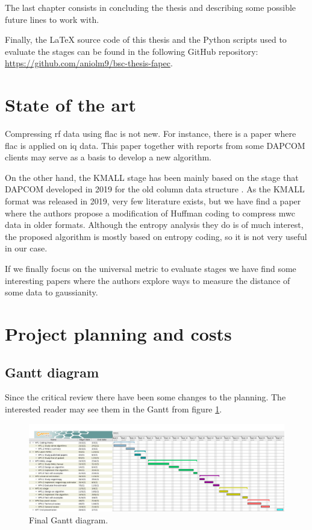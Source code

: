 The last chapter consists in concluding the thesis and describing some possible future lines to work with.

Finally, the \LaTeX{} source code of this thesis and the Python scripts used to evaluate the stages can be found in the following GitHub repository: \url{https://github.com/aniolm9/bsc-thesis-fapec}.

\section{State of the art}
Compressing \acrshort{rf} data using \acrshort{flac} is not new. For instance, there is a paper \parencite{IQFlac} where \acrshort{flac} is applied on \acrshort{iq} data. This paper together with reports from some DAPCOM clients may serve as a basis to develop a new algorithm.

On the other hand, the KMALL stage has been mainly based on the stage that DAPCOM developed in 2019 for the old column data structure \parencite{Portell2019}. As the KMALL format was released in 2019, very few literature exists, but we have find a paper \parencite{MBESComp} where the authors propose a modification of Huffman coding to compress \acrshort{mwc} data in older formats. Although the entropy analysis they do is of much interest, the proposed algorithm is mostly based on entropy coding, so it is not very useful in our case.

If we finally focus on the universal metric to evaluate stages we have find some interesting papers \parencite{negentropy} \parencite{HYVARINEN2000411} where the authors explore ways to measure the distance of some data to gaussianity.

\section{Project planning and costs}
\subsection{Gantt diagram}
Since the critical review there have been some changes to the planning. The interested reader may see them in the Gantt from figure \ref{fig:gantt}.
\begin{figure}[h!]
	\begin{center}
		\includegraphics[scale=0.255]{images/gantt.png}
	\end{center}
	\caption{Final Gantt diagram.}
	\label{fig:gantt}
\end{figure}

